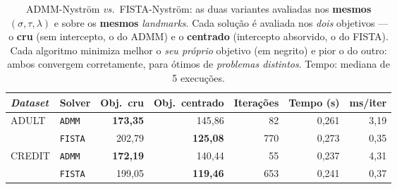 \begin{table}[ht]
  \centering
  \caption{ADMM-Nyström \emph{vs.}\ FISTA-Nyström: as duas variantes avaliadas nos \textbf{mesmos} $(\sigma,\tau,\lambda)$ e sobre os \textbf{mesmos} \textit{landmarks}. Cada solução é avaliada nos \emph{dois} objetivos --- o \textbf{cru} (sem intercepto, o do ADMM) e o \textbf{centrado} (intercepto absorvido, o do FISTA). Cada algoritmo minimiza melhor o \emph{seu próprio} objetivo (em negrito) e pior o do outro: ambos convergem corretamente, para ótimos de \emph{problemas distintos}. Tempo: mediana de 5 execuções.}
  \label{tab:admm_fista_opt}
  \begin{tabular}{llrrrrr}
    \toprule
    \emph{Dataset} & Solver & Obj.\ cru & Obj.\ centrado & Iterações & Tempo (s) & ms/iter \\
    \midrule
    \multirow{2}{*}{ADULT} & \texttt{ADMM} & \textbf{173,35} & 145,86 & 82 & 0,261 & 3,19 \\
     & \texttt{FISTA} & 202,79 & \textbf{125,08} & 770 & 0,273 & 0,35 \\
    \midrule
    \multirow{2}{*}{CREDIT} & \texttt{ADMM} & \textbf{172,19} & 140,44 & 55 & 0,237 & 4,31 \\
     & \texttt{FISTA} & 199,05 & \textbf{119,46} & 653 & 0,241 & 0,37 \\
    \bottomrule
  \end{tabular}
\end{table}

